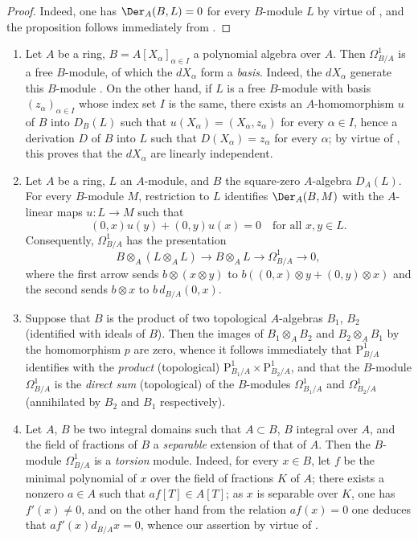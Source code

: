 \begin{proof}
Indeed, one has $\Der_A(B,L)=0$ for every $B$-module $L$ by virtue of , and the proposition follows immediately from .
\end{proof}

\begin{examples}[20.4.13]
\label{0.20.4.13}
\begin{enumerate}
  \item[\rm(i)] Let $A$ be a ring, $B=A[X_\alpha]_{\alpha\in I}$ a polynomial algebra over $A$.
Then $\Omega^1_{B/A}$ is a free $B$-module, of which the $dX_\alpha$ form a \emph{basis}.
Indeed, the $dX_\alpha$ generate this $B$-module .
On the other hand, if $L$ is a free $B$-module with basis $(z_\alpha)_{\alpha\in I}$ whose index set $I$ is the same, there exists an $A$-homomorphism $u$ of $B$ into $D_B(L)$ such that $u(X_\alpha)=(X_\alpha,z_\alpha)$ for every $\alpha\in I$, hence  a derivation $D$ of $B$ into $L$ such that $D(X_\alpha)=z_\alpha$ for every $\alpha$; by virtue of , this proves that the $dX_\alpha$ are linearly independent.
  \item[\rm(ii)] Let $A$ be a ring, $L$ an $A$-module, and $B$ the square-zero
  $A$-algebra $D_A(L)$. For every $B$-module $M$, restriction to $L$ identifies
  $\Der_A(B,M)$ with the $A$-linear maps $u:L\to M$ such that
  \[
    (0,x)u(y)+(0,y)u(x)=0\quad\text{for all }x,y\in L.
  \]
  Consequently, $\Omega^1_{B/A}$ has the presentation
  \[
    B\otimes_A(L\otimes_A L)\longrightarrow B\otimes_A L
    \longrightarrow\Omega^1_{B/A}\longrightarrow0,
  \]
  where the first arrow sends $b\otimes(x\otimes y)$ to
  $b((0,x)\otimes y+(0,y)\otimes x)$ and the second sends $b\otimes x$ to
  $b\,d_{B/A}(0,x)$.
  \item[\rm(iii)] Suppose that $B$ is the product of two topological $A$-algebras $B_1$, $B_2$ (identified with ideals of $B$).
Then the images of $B_1\otimes_A B_2$ and $B_2\otimes_A B_1$ by the homomorphism $p$  are zero, whence it follows immediately that $\mathrm{P}^1_{B/A}$ identifies with the \emph{product} (topological) $\mathrm{P}^1_{B_1/A}\times\mathrm{P}^1_{B_2/A}$, and that the $B$-module $\Omega^1_{B/A}$ is the \emph{direct sum} (topological) of the $B$-modules $\Omega^1_{B_1/A}$ and $\Omega^1_{B_2/A}$ (annihilated by $B_2$ and $B_1$ respectively).
  \item[\rm(iv)] Let $A$, $B$ be two integral domains such that $A\subset B$, $B$ integral over $A$, and the field of fractions of $B$ a \emph{separable} extension of that of $A$.
Then the $B$-module $\Omega^1_{B/A}$ is a \emph{torsion} module.
Indeed, for every $x\in B$, let $f$ be the minimal polynomial of $x$ over the field of fractions $K$ of $A$; there exists a nonzero $a\in A$ such that $af[T]\in A[T]$; as $x$ is separable over $K$, one has $f'(x)\neq 0$, and on the other hand from the relation $af(x)=0$ one deduces that $af'(x)d_{B/A}x=0$, whence our assertion by virtue of .
\end{enumerate}
\end{examples}

